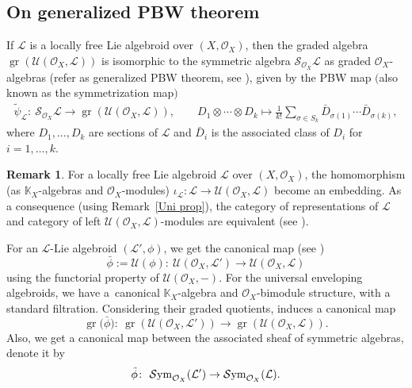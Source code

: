 \documentclass[pdftex]{sigma}
\numberwithin{equation}{section}
\theoremstyle{definition}
\newtheorem{Rem}[Thm]{Remark}
\begin{document}
\subsection{On generalized PBW theorem}
\label{Gen PBW}
 If $\mathcal{L}$ is a locally free Lie algebroid over $(X, \mathcal{O}_X)$, then the graded algebra $\operatorname{gr}(\mathcal{U}(\mathcal{O}_{X}, \mathcal{L}))$ is isomorphic to the symmetric algebra $\mathcal{S}_{\mathcal{O}_{X}}\mathcal{L}$ as graded $\mathcal{O}_X$-algebras (refer as generalized PBW theorem, see \cite{MK,AA, BP}), given by the PBW map $($also known as the symmetrization map$)$
\begin{gather*}
\tilde{\psi}_{\mathcal{L}} \colon \ \mathcal{S}_{\mathcal{O}_X}\mathcal{L} \rightarrow \operatorname{gr}(\mathcal{U}(\mathcal{O}_{X}, \mathcal{L})), \qquad
	 D_1 \otimes \cdots \otimes D_k \mapsto \frac{1}{k!} \sum_{\sigma \in S_k} \bar{D}_{\sigma(1)} \cdots \bar{D}_{\sigma(k)},
\end{gather*}
where $D_1, \dots , D_k$ are sections of $\mathcal{L}$ and $\bar{D}_{i}$ is the associated class of $D_i$ for $i= 1, \dots, k$.

\begin{Rem}\label{embed}
For a locally free Lie algebroid $\mathcal{L}$ over $(X, \mathcal{O}_X)$, the homomorphism (as $\mathbb{K}_X$\nobreakdash-alge\-bras and $\mathcal{O}_X$-modules) $\iota_{\mathcal{L}}\colon \mathcal{L} \rightarrow \mathcal{U}(\mathcal{O}_X,\mathcal{L})$ become an embedding.
	As a consequence (using Remark~\ref{Uni prop}), the category of representations of $\mathcal{L}$ and category of left $\mathcal{U}(\mathcal{O}_X, \mathcal{L})$-modules are equivalent (see \cite{UB, BP, AS}).
\end{Rem}
For an $\mathcal{L}$-Lie algebroid $(\mathcal{L}', \phi)$, we get the canonical map (see \cite{UB, AA})
\[
\bar{\phi}:=\mathcal{U}(\phi)\colon \ \mathcal{U}(\mathcal{O}_X, \mathcal{L}') \rightarrow \mathcal{U}(\mathcal{O}_X, \mathcal{L})
\]
using the functorial property of $ \mathcal{U}(\mathcal{O}_X, -)$. For the universal enveloping algebroids, we have a~canonical $\mathbb{K}_X$-algebra and $\mathcal{O}_X$-bimodule structure, with a standard filtration. Considering their graded quotients, induces a canonical map
\[
\operatorname{gr}\bigl(\bar{\phi}\bigr)\colon \ \operatorname{gr}(\mathcal{U}(\mathcal{O}_X, \mathcal{L}')) \rightarrow \operatorname{gr}(\mathcal{U}(\mathcal{O}_X, \mathcal{L})).
\]
Also, we get a canonical map between the associated sheaf of symmetric algebras, denote it by
\[
\tilde{\phi}\colon \ \mathcal{S}{\rm ym}_{\mathcal{O}_X}(\mathcal{L}') \rightarrow \mathcal{S}{\rm ym}_{\mathcal{O}_X}(\mathcal{L}).
\]
\end{document}
